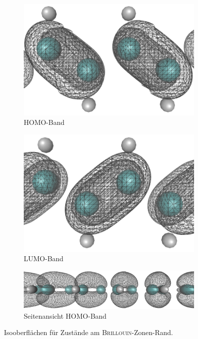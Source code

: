 \begin{frame}
\begin{figure}
	\centering
	\begin{subfigure}{0.4\textwidth}
	\includegraphics[width = \textwidth]{Images/polyacetylene/wavefunctions/Homo_Cut}
	\caption{HOMO-Band}
	\label{image_homo1}
	\end{subfigure}\hspace*{2cm}
	\begin{subfigure}{0.4\textwidth}
	\centering
	\includegraphics[width = \textwidth]{Images/polyacetylene/wavefunctions/LUMO_Cut}
	\caption{LUMO-Band}
	\label{image_lumo1}
	\end{subfigure}
	\begin{subfigure}{\textwidth}
	\centering
	\includegraphics[width = 10cm]{Images/polyacetylene/wavefunctions/HOMO_Side_View}
	\caption{Seitenansicht HOMO-Band}
	\label{image_homo1_side_view}
	\end{subfigure}
	\caption{Isooberflächen für Zustände am \textsc{Brillouin}-Zonen-Rand.}
\end{figure}
\end{frame}

